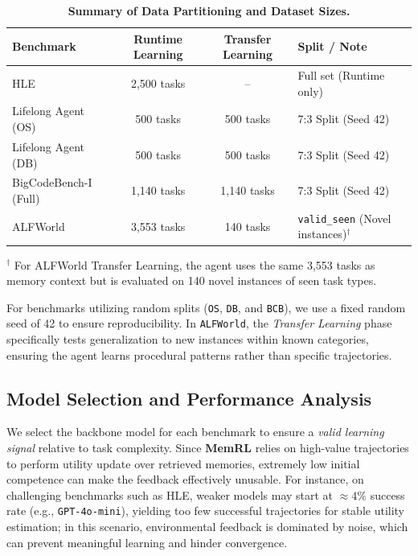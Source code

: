 \documentclass{article}
\theoremstyle{plain}
\theoremstyle{definition}
\theoremstyle{remark}
\begin{document}
\begin{table}[H]
    \centering
    \footnotesize %
    \caption{\textbf{Summary of Data Partitioning and Dataset Sizes.}}
    \label{tab:data_split}
    \setlength{\tabcolsep}{8pt} %
    \begin{tabular}{l c c l}
        \toprule
        \textbf{Benchmark} & \textbf{Runtime Learning} & \textbf{Transfer Learning} & \textbf{Split / Note} \\
        \midrule
        HLE & 2,500 tasks  & -- & Full set (Runtime only) \\
        Lifelong Agent (OS) & 500 tasks & 500 tasks & 7:3 Split (Seed 42) \\
        Lifelong Agent (DB) & 500 tasks & 500 tasks & 7:3 Split (Seed 42) \\
        BigCodeBench-I (Full) & 1,140 tasks & 1,140 tasks & 7:3 Split (Seed 42) \\
        ALFWorld & 3,553 tasks & 140 tasks & \texttt{valid\_seen} (Novel instances)$^\dagger$ \\
        \bottomrule
    \end{tabular}
    \begin{flushleft}
    \scriptsize $^\dagger$ For ALFWorld Transfer Learning, the agent uses the same 3,553 tasks as memory context but is evaluated on 140 novel instances of seen task types.
    \end{flushleft}
\end{table}

For benchmarks utilizing random splits (\texttt{OS}, \texttt{DB}, and \texttt{BCB}), we use a fixed random seed of 42 to ensure reproducibility. In \texttt{ALFWorld}, the \textit{Transfer Learning} phase specifically tests generalization to new instances within known categories, ensuring the agent learns procedural patterns rather than specific trajectories.
\subsection{Model Selection and Performance Analysis}
\label{subsec:model_selection_regimes}

We select the backbone model for each benchmark to ensure a \emph{valid learning signal} relative to task complexity. Since \textbf{MemRL} relies on high-value trajectories to perform utility update over retrieved memories, extremely low initial competence can make the feedback effectively unusable. For instance, on challenging benchmarks such as HLE, weaker models may start at $\approx 4\%$ success rate (e.g., \texttt{GPT-4o-mini}), yielding too few successful trajectories for stable utility estimation; in this scenario, environmental feedback is dominated by noise, which can prevent meaningful learning and hinder convergence.
\end{document}
